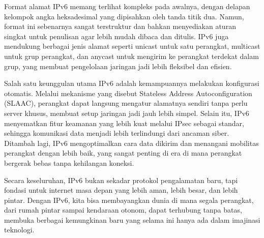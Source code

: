 \documentclass[12pt,a4paper]{article}
\begin{document}
Format alamat IPv6 memang terlihat kompleks pada awalnya, dengan delapan kelompok angka heksadesimal yang dipisahkan oleh tanda titik dua. Namun, format ini sebenarnya sangat terstruktur dan bahkan menyediakan aturan singkat untuk penulisan agar lebih mudah dibaca dan ditulis. IPv6 juga mendukung berbagai jenis alamat seperti unicast untuk satu perangkat, multicast untuk grup perangkat, dan anycast untuk mengirim ke perangkat terdekat dalam grup, yang membuat pengelolaan jaringan jadi lebih fleksibel dan efisien.

Salah satu keunggulan utama IPv6 adalah kemampuannya melakukan konfigurasi otomatis. Melalui mekanisme yang disebut Stateless Address Autoconfiguration (SLAAC), perangkat dapat langsung mengatur alamatnya sendiri tanpa perlu server khusus, membuat setup jaringan jadi jauh lebih simpel. Selain itu, IPv6 menyematkan fitur keamanan yang lebih kuat melalui IPsec sebagai standar, sehingga komunikasi data menjadi lebih terlindungi dari ancaman siber. Ditambah lagi, IPv6 mengoptimalkan cara data dikirim dan menangani mobilitas perangkat dengan lebih baik, yang sangat penting di era di mana perangkat bergerak bebas tanpa kehilangan koneksi.

Secara keseluruhan, IPv6 bukan sekadar protokol pengalamatan baru, tapi fondasi untuk internet masa depan yang lebih aman, lebih besar, dan lebih pintar. Dengan IPv6, kita bisa membayangkan dunia di mana segala perangkat, dari rumah pintar sampai kendaraan otonom, dapat terhubung tanpa batas, membuka berbagai kemungkinan baru yang selama ini hanya ada dalam imajinasi teknologi.
\end{document}

